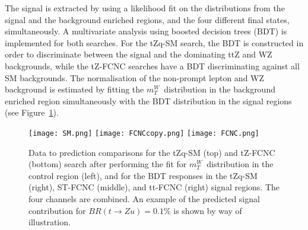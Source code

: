 \documentclass[12pt]{article}
\def\mT{$m_T^W$}
\begin{document}
The signal is extracted by using a likelihood fit on the distributions from the signal and the background enriched regions, and the four different final states, simultaneously. A multivariate analysis using boosted decision trees (BDT) is implemented for both searches.  For the tZq-SM search, the BDT is constructed in order to discriminate between the signal and the dominating ttZ and WZ backgrounds, while the tZ-FCNC searches have a BDT discriminating against all SM backgrounds. The normalisation of the non-prompt lepton and WZ background is estimated by fitting the \mT\ distribution in the background enriched region simultaneously with the BDT distribution in the signal regions (see Figure~\ref{fig:fit}).

\begin{figure}[htb]
\centering
\texttt{[image: SM.png]}
\texttt{[image: FCNCcopy.png]}
\texttt{[image: FCNC.png]}
\caption{Data to prediction comparisons for the tZq-SM (top) and tZ-FCNC (bottom) search after performing the fit for \mT\ distribution in the control region (left), and for the BDT responses in the tZq-SM (right), ST-FCNC (middle), and tt-FCNC (right) signal regions. The four channels are combined. An example of the predicted signal contribution for  $BR(t\rightarrow Zu) = 0.1\%$ is shown by way of illustration. }
\label{fig:fit}
\end{figure}








\end{document}
